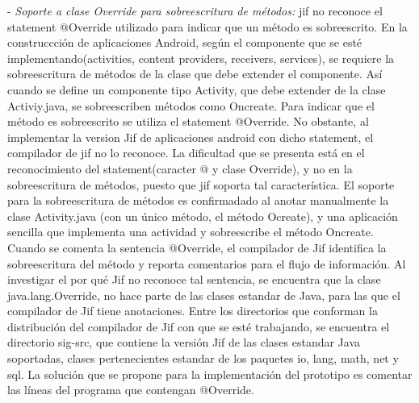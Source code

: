 - \textit{Soporte a clase Override para sobreescritura de métodos:}\newline 
jif no reconoce el statement @Override utilizado para indicar que un método
es sobreescrito.\newline
En la construccción de aplicaciones Android, según el componente que se esté
implementando(activities, content providers, receivers, services), se requiere
la sobreescritura de métodos de la clase que debe extender el componente. Así
cuando se define un componente tipo Activity, que debe extender de la clase
Activiy.java, se sobreescriben métodos como Oncreate. Para indicar que el método
es sobreescrito se utiliza el statement @Override. No obstante, al implementar
la version Jif de aplicaciones android con dicho statement, el compilador de jif
no lo reconoce. La dificultad que se presenta está en el reconocimiento del
statement(caracter @ y clase Override), y no en la sobreescritura de métodos,
puesto que jif soporta tal característica. El soporte para la sobreescritura de
métodos es confirmadado al anotar manualmente la clase Activity.java (con un
único método, el método Ocreate), y una aplicación sencilla que implementa una
actividad y sobreescribe el método Oncreate. Cuando se comenta la sentencia
@Override, el compilador de Jif identifica la sobreescritura del método y
reporta comentarios para el flujo de información.\newline 
Al investigar el por qué Jif no reconoce tal sentencia, se encuentra que la
clase java.lang.Override, no hace parte de las clases estandar de Java, para las
que el compilador de Jif tiene anotaciones.\newline
Entre los directorios que conforman la distribución del compilador de Jif con
que se esté trabajando, se encuentra el directorio sig-src, que contiene la
versión Jif de las clases estandar Java soportadas, clases pertenecientes
estandar de los paquetes io, lang, math, net y sql.\newline 
La solución que se propone para la implementación del prototipo es comentar las
líneas del programa que contengan @Override.\newline

